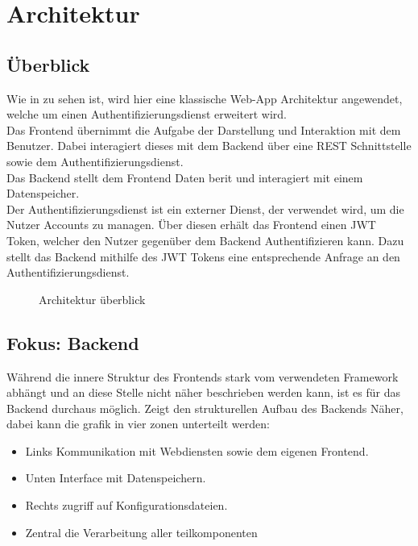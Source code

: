 \chapter{Architektur}\label{ch:architektur}

\section{Überblick}\label{sec:uberblick}
Wie in  zu sehen ist, wird hier eine klassische Web-App Architektur angewendet,
welche um einen Authentifizierungsdienst erweitert wird.\\
Das Frontend übernimmt die Aufgabe der Darstellung und Interaktion mit dem Benutzer.
Dabei interagiert dieses mit dem Backend über eine \ac{REST} Schnittstelle sowie dem Authentifizierungsdienst.\\
Das Backend stellt dem Frontend Daten berit und interagiert mit einem Datenspeicher.\\
Der Authentifizierungsdienst ist ein externer Dienst, der verwendet wird, um die Nutzer Accounts zu managen.
Über diesen erhält das Frontend einen \ac{JWT} Token, welcher den Nutzer gegenüber dem Backend Authentifizieren kann.
Dazu stellt das Backend mithilfe des \ac{JWT} Tokens eine entsprechende Anfrage an den Authentifizierungsdienst.

\begin{figure}[h]
    \centering
    
    \caption{Architektur überblick}\label{fig:HighLevelArch}
\end{figure}

\section{Fokus: Backend}\label{sec:fokus:-backend}

Während die innere Struktur des Frontends stark vom verwendeten Framework abhängt und an diese Stelle nicht näher beschrieben werden kann,
ist es für das Backend durchaus möglich.
 Zeigt den strukturellen Aufbau des Backends Näher, dabei kann die grafik in vier zonen unterteilt werden:
\begin{itemize}
    \item Links Kommunikation mit Webdiensten sowie dem eigenen Frontend.
    \item Unten Interface mit Datenspeichern.
    \item Rechts zugriff auf Konfigurationsdateien.
    \item Zentral die Verarbeitung aller teilkomponenten
\end{itemize}

